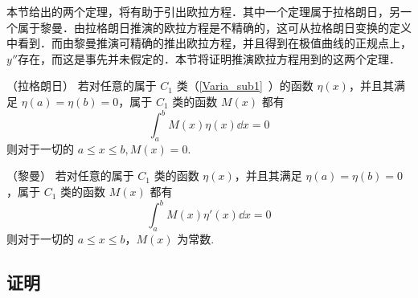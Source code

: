 
\begin{issues}
\issueTODO
\end{issues}

本节给出的两个定理，将有助于引出欧拉方程．其中一个定理属于拉格朗日，另一个属于黎曼．由拉格朗日推演的欧拉方程是不精确的，这可从拉格朗日变换的定义中看到．而由黎曼推演可精确的推出欧拉方程，并且得到在极值曲线的正规点上，$y''$存在，而这是事先并未假定的．本节将证明推演欧拉方程用到的这两个定理．

\begin{theorem}{（拉格朗日）}
若对任意的属于 $C_1$ 类（\autoref{Varia_sub1}~）的函数 $\eta(x)$，并且其满足 $\eta(a)=\eta(b)=0$，属于 $C_1$ 类的函数 $M(x)$ 都有
\begin{equation}
\int_a^b M(x)\eta(x)\dd x=0
\end{equation}
则对于一切的 $a\leq x\leq b,M(x)=0$.
\end{theorem}
\begin{theorem}{（黎曼）}
若对任意的属于 $C_1$ 类的函数 $\eta(x)$，并且其满足 $\eta(a)=\eta(b)=0$，属于 $C_1$ 类的函数 $M(x)$ 都有
\begin{equation}
\int_a^b M(x)\eta'(x)\dd x=0
\end{equation}
则对于一切的 $a\leq x\leq b$，$M(x)$ 为常数.
\end{theorem}
\subsection{证明}